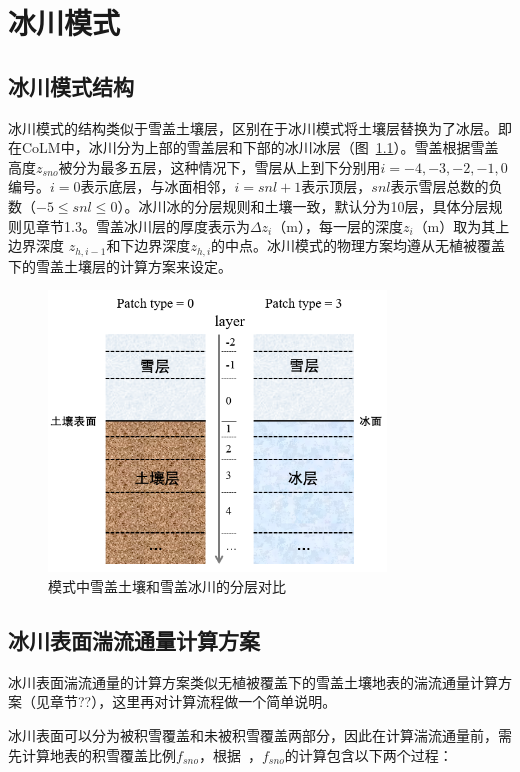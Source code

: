 \chapter{冰川模式}
\section{冰川模式结构}
冰川模式的结构类似于雪盖土壤层，区别在于冰川模式将土壤层替换为了冰层。即在CoLM中，冰川分为上部的雪盖层和下部的冰川冰层（图~\ref{fig:模式中雪盖土壤和雪盖冰川的分层对比}）。雪盖根据雪盖高度$z_{sno}$被分为最多五层，这种情况下，雪层从上到下分别用$i=-4,-3,-2,-1,0$编号。$i=0$表示底层，与冰面相邻，$i=snl+1$表示顶层，$snl$表示雪层总数的负数（$-5\leqslant snl\leqslant 0$）。冰川冰的分层规则和土壤一致，默认分为10层，具体分层规则见章节1.3。雪盖冰川层的厚度表示为$\Delta z_i$（m），每一层的深度$z_i$（m）取为其上边界深度 $z_{h,i−1}$和下边界深度$z_{h,i}$的中点。冰川模式的物理方案均遵从无植被覆盖下的雪盖土壤层的计算方案来设定。

 {
\begin{figure}[htbp]
\centering
\includegraphics[width=0.8\textwidth]{Figures/冰川模式/模式中雪盖土壤和雪盖冰川的分层对比.jpg}
\caption{模式中雪盖土壤和雪盖冰川的分层对比}
\label{fig:模式中雪盖土壤和雪盖冰川的分层对比}
\end{figure}
}

\section{冰川表面湍流通量计算方案}
冰川表面湍流通量的计算方案类似无植被覆盖下的雪盖土壤地表的湍流通量计算方案（见章节??），这里再对计算流程做一个简单说明。

冰川表面可以分为被积雪覆盖和未被积雪覆盖两部分，因此在计算湍流通量前，需先计算地表的积雪覆盖比例$f_{sno}$，根据~\citet{swenson2012new}，$f_{sno}$的计算包含以下两个过程：

